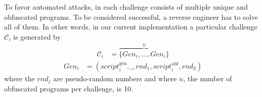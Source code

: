To favor automated attacks, in \revenge each challenge consists of multiple unique and obfuscated programs. To be considered successful, a reverse engineer has to solve all of them. In other words, in our current implementation a particular challenge $\mathcal{C}_i$ is generated by 
\begin{align}
\mathcal{C}_i & =  
   \overbrace{
      \{\mathit{Gen}_i, \ldots, \mathit{Gen}_i\}
   }^{n} 
\end{align}   
\begin{align}
   \mathit{Gen}_i & =  
   (
   \mathit{script}_i^\mathrm{gen}, 
   \_, 
   \mathit{rnd}_1, 
   \mathit{script}_i^\mathrm{obf},
   \mathit{rnd}_2
   )
\end{align}
where the $\mathit{rnd}_j$ are pseudo-random numbers and where $n$, the number of obfuscated programs per challenge, is 10.




